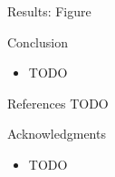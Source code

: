 \documentclass[final,hyperref={pdfpagelabels=false}]{beamer}
\begin{document}
\begin{frame}[t]
\begin{columns}[t]
\begin{column}{.465\textwidth}
\begin{block}{Results: Figure}
\end{block}


\begin{block}{Conclusion}

\begin{itemize}
\item TODO
\end{itemize}

\end{block}


\begin{block}{References}
TODO
        
\nocite{*} %
\small{
}

\end{block}


\begin{block}{Acknowledgments}

\begin{itemize}
\item TODO
\end{itemize}


\end{block}
\end{column}
\end{columns}
\end{frame}
\end{document}
